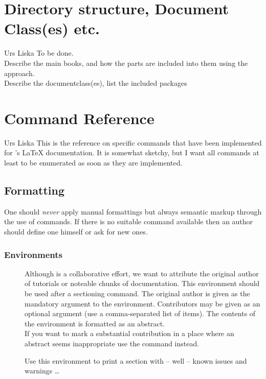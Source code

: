 \documentclass[openLilyLib_CG]{subfiles}
\begin{document}
\chapter{Directory structure, Document Class(es) etc.}

\begin{authorAbstract}{Urs Liska}
To be done.\\
Describe the main books, and how the parts are included into them using the  approach.\\
Describe the documentclass(es), list the included packages
\end{authorAbstract}




\chapter{Command Reference}
\begin{authorAbstract}{Urs Liska}
This is the reference on specific commands that have been implemented for \openlilylib's \LaTeX{} documentation.
It is somewhat sketchy, but I want all commands at least to be enumerated as soon as they are implemented.
\end{authorAbstract}

\section{Formatting}
One should \emph{never} apply manual formattings but always semantic markup through the use of commands.
If there is no suitable command available then an author should define one himself or ask for new ones.

\subsection{Environments}
\begin{description}
\item[] Although \openlilylib{} is a collaborative effort, we want to attribute the original author of tutorials or noteable chunks of documentation.
This environment should be used after a sectioning command.
The original author is given as the mandatory argument to the environment.
Contributors may be given as an optional argument (use a comma-separated list of  items).
The contents of the environment is formatted as an abstract.
\\
If you want to mark a substantial contribution in a place where an abstract seems inappropriate use the command  instead.
\item[] Use this environment to print a section with -- well -- known issues and warnings \dots
\end{description}
\end{document}
